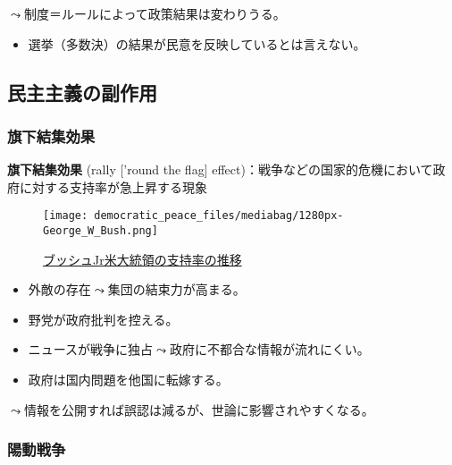 \documentclass[
  xelatex,
  ja=standard]{bxjsarticle}
\providecommand{\tightlist}{%
  \setlength{\itemsep}{0pt}\setlength{\parskip}{0pt}}\usepackage{longtable,booktabs,array}
\begin{document}
\(\leadsto\)制度＝ルールによって政策結果は変わりうる。

\begin{itemize}
\tightlist
\item
  選挙（多数決）の結果が民意を反映しているとは言えない。
\end{itemize}

\hypertarget{ux6c11ux4e3bux4e3bux7fa9ux306eux526fux4f5cux7528}{%
\subsection{民主主義の副作用}\label{ux6c11ux4e3bux4e3bux7fa9ux306eux526fux4f5cux7528}}

\hypertarget{ux65d7ux4e0bux7d50ux96c6ux52b9ux679c}{%
\subsubsection{旗下結集効果}\label{ux65d7ux4e0bux7d50ux96c6ux52b9ux679c}}

\textbf{旗下結集効果} (rally {[}'round the flag{]}
effect)：戦争などの国家的危機において政府に対する支持率が急上昇する現象\citep{mueller1970}

\begin{figure}[htpb]

{\centering \texttt{[image: democratic\_peace\_files/mediabag/1280px-George\_W\_Bush.png]}

}

\caption{\href{https://commons.wikimedia.org/wiki/File:George_W_Bush_approval_ratings_with_events.svg}{ブッシュJr米大統領の支持率の推移}}

\end{figure}

\begin{itemize}
\tightlist
\item
  外敵の存在\(\leadsto\)集団の結束力が高まる。
\item
  野党が政府批判を控える。
\item
  ニュースが戦争に独占\(\leadsto\)政府に不都合な情報が流れにくい。
\item
  政府は国内問題を他国に転嫁する。
\end{itemize}

\(\leadsto\)情報を公開すれば誤認は減るが、世論に影響されやすくなる。

\hypertarget{ux967dux52d5ux6226ux4e89}{%
\subsubsection{陽動戦争}\label{ux967dux52d5ux6226ux4e89}}
\end{document}
